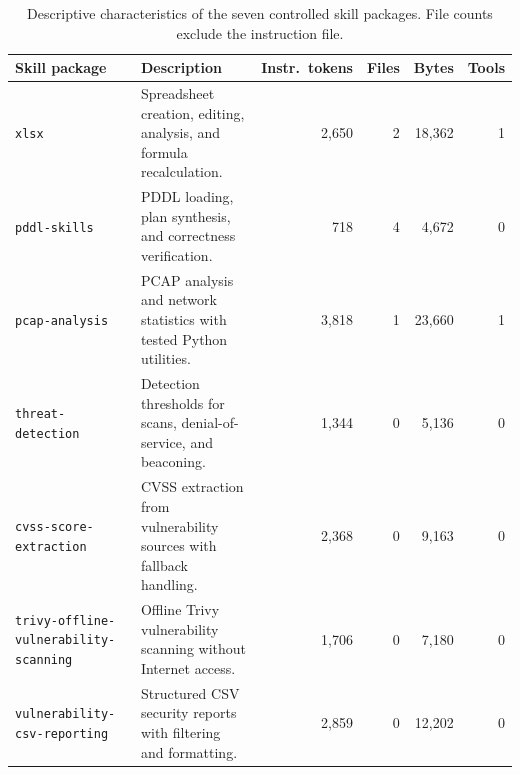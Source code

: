 \documentclass[letterpaper,twocolumn,10pt]{article}
\begin{document}
\begin{table}[!t]
  \vspace{8pt}
  \centering
  \scriptsize
  \caption{Descriptive characteristics of the seven controlled skill packages.
  File counts exclude the instruction file.}
  \label{tab:factor-results}
  \setlength{\tabcolsep}{4pt}
  \renewcommand{\arraystretch}{1.04}
  \begin{tabularx}{\textwidth}{@{}lYrrrr@{}}
    \toprule
    Skill package & Description & Instr.\ tokens & Files & Bytes & Tools \\
    \midrule
    \texttt{xlsx} &
    Spreadsheet creation, editing, analysis, and formula recalculation. &
    2,650 & 2 & 18,362 & 1 \\
    \texttt{pddl-skills} &
    PDDL loading, plan synthesis, and correctness verification. &
    718 & 4 & 4,672 & 0 \\
    \texttt{pcap-analysis} &
    PCAP analysis and network statistics with tested Python utilities. &
    3,818 & 1 & 23,660 & 1 \\
    \texttt{threat-detection} &
    Detection thresholds for scans, denial-of-service, and beaconing. &
    1,344 & 0 & 5,136 & 0 \\
    \texttt{cvss-score-extraction} &
    CVSS extraction from vulnerability sources with fallback handling. &
    2,368 & 0 & 9,163 & 0 \\
    \texttt{trivy-offline-vulnerability-scanning} &
    Offline Trivy vulnerability scanning without Internet access. &
    1,706 & 0 & 7,180 & 0 \\
    \texttt{vulnerability-csv-reporting} &
    Structured CSV security reports with filtering and formatting. &
    2,859 & 0 & 12,202 & 0 \\
    \bottomrule
  \end{tabularx}
\end{table}
\end{document}
